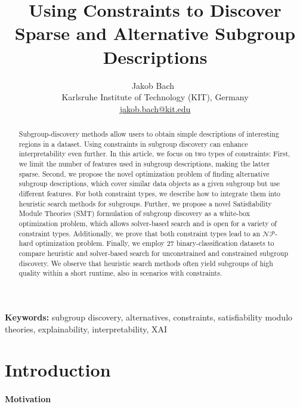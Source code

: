 \documentclass{article}
\title{
	Using Constraints to Discover Sparse and Alternative Subgroup Descriptions
}
\author{
	Jakob Bach~\orcidlink{0000-0003-0301-2798}\\
	\small Karlsruhe Institute of Technology (KIT), Germany\\
	\small \href{mailto:jakob.bach@kit.edu}{jakob.bach@kit.edu}
}
\date{} %
\theoremstyle{definition}
\begin{document}
\maketitle

\begin{abstract}
Subgroup-discovery methods allow users to obtain simple descriptions of interesting regions in a dataset.
Using constraints in subgroup discovery can enhance interpretability even further.
In this article, we focus on two types of constraints:
First, we limit the number of features used in subgroup descriptions, making the latter sparse.
Second, we propose the novel optimization problem of finding alternative subgroup descriptions, which cover similar data objects as a given subgroup but use different features.
For both constraint types, we describe how to integrate them into heuristic search methods for subgroups.
Further, we propose a novel Satisfiability Module Theories (SMT) formulation of subgroup discovery as a white-box optimization problem, which allows solver-based search and is open for a variety of constraint types.
Additionally, we prove that both constraint types lead to an $\mathcal{NP}$-hard optimization problem.
Finally, we employ 27 binary-classification datasets to compare heuristic and solver-based search for unconstrained and constrained subgroup discovery.
We observe that heuristic search methods often yield subgroups of high quality within a short runtime, also in scenarios with constraints.
\end{abstract}
%
\textbf{Keywords:} subgroup discovery, alternatives, constraints, satisfiability modulo theories, explainability, interpretability, XAI

\section{Introduction}
\label{sec:csd:introduction}

\paragraph{Motivation}
\end{document}

